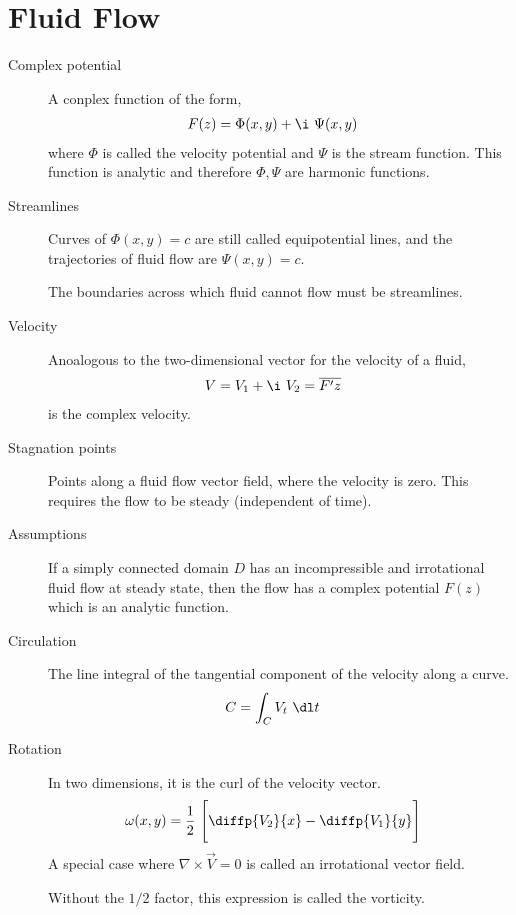 \section{Fluid Flow}

\begin{description}
    \item[Complex potential] A conplex function of the form,
        \begin{align}
            F(z) & = \Phi(x, y) + \i\ \Psi(x, y)
        \end{align}
        where $ \Phi $ is called the velocity potential and $ \Psi $ is the stream
        function. This function is analytic and therefore $ \Phi, \Psi $ are
        harmonic functions.

    \item[Streamlines] Curves of $ \Phi(x, y) = c $ are still called equipotential lines,
        and the trajectories of fluid flow are $ \Psi(x, y) = c $. \par
        The boundaries across which fluid cannot flow must be streamlines.

    \item[Velocity] Anoalogous to the two-dimensional vector for the velocity of a fluid,
        \begin{align}
            V & = V_1 + \i\ V_2 = \overline{F'{z}}
        \end{align}
        is the complex velocity.

    \item[Stagnation points] Points along a fluid flow vector field, where the
        velocity is zero. This requires the flow to be steady (independent of time).

    \item[Assumptions] If a simply connected domain $ D $ has an incompressible
        and irrotational fluid flow at steady state, then the flow has a complex
        potential $ F(z) $ which is an analytic function.

    \item[Circulation] The line integral of the tangential component of the velocity
        along a curve.
        \begin{align}
            C & = \int_{C} V_t\ \dl t
        \end{align}

    \item[Rotation] In two dimensions, it is the curl of the velocity vector.
        \begin{align}
            \omega(x, y) & = \frac{1}{2}\ \Bigg[\diffp{V_2}{x} - \diffp{V_1}{y}\Bigg]
        \end{align}
        A special case where $ \nabla \times \vec{V} = 0 $ is called an irrotational
        vector field. \par
        Without the $ 1/2 $ factor, this expression is called the vorticity.


\end{description}
